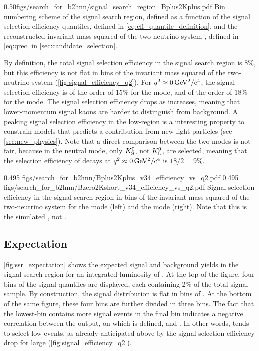{0.50}{figs/search_for_b2hnn/signal_search_region_Bplus2Kplus.pdf}
{Bin numbering scheme of the signal search region, defined as a function of the signal selection efficiency quantiles, defined in \cref{eq:eff_quantile_definition}, and the reconstructed invariant mass squared of the two-neutrino system \qrec, defined in \cref{eq:qrec} in \cref{sec:candidate_selection}.}

By definition, the total signal selection efficiency in the signal search region is 8\%, but this efficiency is not flat in bins of the invariant mass squared of the two-neutrino system \qq (\cref{fig:signal_efficiency_q2}).
For $q^2\approx0\,\mathrm{GeV^2/c^4}$, the signal selection efficiency is of the order of $15\%$ for the \BKpnn mode, and of the order of $18\%$ for the \BKznn mode.
The signal selection efficiency drops as \qq increases, meaning that lower-momentum signal kaons are harder to distinguish from background.
A peaking signal selection efficiency in the low-\qq region is a interesting property to constrain models that predicts a contribution from new light particles (see \cref{sec:new_physics}).
Note that a direct comparison between the two modes is not fair, because in the neutral mode, only $K^0_{\mathrm{S}}$, not $K^0_{\mathrm{L}}$, are selected, meaning that the selection efficiency of \BKzznn decays at $q^2\approx0\,\mathrm{GeV^2/c^4}$ is $18/2=9\%$.

{0.495}
{figs/search_for_b2hnn/Bplus2Kplus_v34_efficiency_vs_q2.pdf}
{0.495}
{figs/search_for_b2hnn/Bzero2Kshort_v34_efficiency_vs_q2.pdf}
{
Signal selection efficiency in the signal search region in bins of the invariant mass squared of the two-neutrino system for the \BKpnn mode (left) and the \BKznn mode (right).
Note that this is the simulated \qq, not \qrec.
}

\subsection{Expectation} \label{sec:ssr_expectation}

\cref{fig:ssr_expectation} shows the expected signal and background yields in the signal search region for an integrated luminosity of \lumion.
At the top of the figure, four bins of the signal quantiles \esig are displayed, each containing 2\% of the total signal sample.
By construction, the signal distribution is flat in bins of \esig.
At the bottom of the same figure, these four \esig bins are further divided in three \qrec bins.
The fact that the lowest-\qrec bin contains more signal events in the final \esig bin indicates a negative correlation between the \bdtt output, on which \esig is defined, and \qrec.
In other words, \bdtt tends to select low-\qrec events, as already anticipated above by the signal selection efficiency drop for large \qq (\cref{fig:signal_efficiency_q2}).

